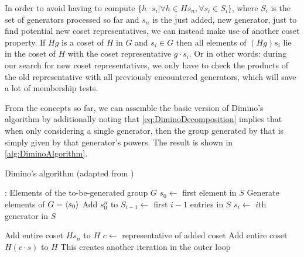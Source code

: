 \documentclass[parskip=half]{scrartcl}
\begin{document}
	In order to avoid having to compute $\{ h \cdot s_i | \forall h \in H s_n, \forall s_i \in S_i \}$, where $S_i$ is the set of generators processed so
	far and $s_n$ is the just added, new generator, just to find potential new coset representatives, we can instead make use of another coset
	property. If $Hg$ is a coset of $H$ in $G$ and $s_i \in G$ then all elements of $(Hg)s_i$ lie in the coset of $H$ with the coset representative $g
	\cdot s_i$.\supercite{Butler1991a} Or in other words: during our search for new coset representatives, we only have to check the products of the
	old representative with all previously encountered generators, which will save a lot of membership tests.

	From the concepts so far, we can assemble the basic version of Dimino's algorithm by additionally noting that \cref{eq:DiminoDecomposition}
	implies that when only considering a single generator, then the group generated by that is simply given by that generator's
	powers.\supercite{Butler1991a} The result is shown in \cref{alg:DiminoAlgorithm}.

	\begin{algorithm}[!htb]
		\caption{Dimino's algorithm (adapted from \textcite{Butler1991a})}
		\label{alg:DiminoAlgorithm}

		\begin{algorithmic}[1]
				\State {}: Elements of the to-be-generated group $G$
				\State $s_0 \gets $ first element in $S$
				\Comment Generate elements of $G = \braket{s_0}$
					\State Add $s_0^n$ to 
				\EndFor
				\For{$i \in [1, $ size of $S) \wedge i \in \mathbb{N}$}
					\State $S_{i-1} \gets$ first $i - 1$ entries in $S$
					\State $s_i \gets$ $i$th generator in $S$
					\State {}
				\EndFor
			\EndFunction

					\State \Return
				\EndIf
				\State Add entire coset $H s_n$ to $H$
					\State $c \gets $ representative of added coset
							\State Add entire coset $H (c \cdot s)$ to $H$
							\Comment This creates another iteration in the outer loop
						\EndIf
					\EndFor
				\EndFor
			\EndFunction
		\end{algorithmic}
	\end{algorithm}
\end{document}
